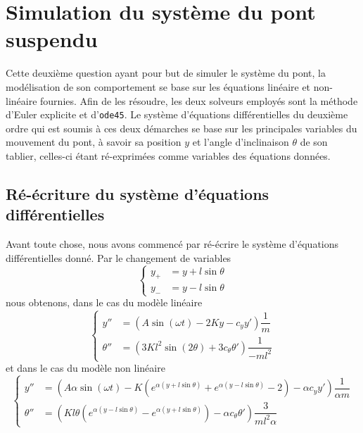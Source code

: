 \documentclass[a4paper, 12pt]{article}
\begin{document}
	\section{Simulation du système du pont suspendu}
	Cette deuxième question ayant pour but de simuler le système du pont, la modélisation de son comportement se base sur les équations linéaire et non-linéaire fournies. Afin de les résoudre, les deux solveurs employés sont la méthode d’Euler explicite et d'\texttt{ode45}. Le système d’équations différentielles du deuxième ordre qui est soumis à ces deux démarches se base sur les principales variables du mouvement du pont, à savoir sa position $y$ et l’angle d'inclinaison $\theta$ de son tablier, celles-ci étant ré-exprimées comme variables des équations données.
	\subsection{Ré-écriture du système d'équations différentielles}
	Avant toute chose, nous avons commencé par ré-écrire le système d'équations différentielles donné. Par le changement de variables
	\begin{equation*}
	\left\{\begin{aligned}
	y_{+} & = y + l \sin\theta \\ 
	y_{-} & = y - l \sin\theta
	\end{aligned}\right.
	\end{equation*}
	nous obtenons, dans le cas du modèle linéaire
	\begin{equation*}
	\left\{\begin{aligned}
	y'' & = \left(A \sin(\omega  t) - 2 K y - c_{y} y'\right) \dfrac{1}{m} \\
	\theta'' & = \left(3 K l^{2} \sin(2 \theta) + 3 c_{\theta} \theta'\right) \dfrac{1}{-m l^{2}}
	\end{aligned}\right.
	\end{equation*}
	et dans le cas du modèle non linéaire
	\begin{equation*}
	\left\{\begin{aligned}
	y'' & = \left(A\alpha \sin(\omega t) - K(e^{\alpha  (y + l \sin \theta)} + e^{\alpha  (y - l \sin \theta)} - 2) - \alpha c_{y} y'\right) \dfrac{1}{\alpha m} \\
	\theta'' & = \left(K  l \theta (e^{\alpha  (y - l \sin \theta)} - e^{\alpha  (y + l \sin \theta)}) - \alpha c_{\theta} \theta'\right) \dfrac{3}{m l^{2}\alpha}
	\end{aligned}\right.
	\end{equation*}
\end{document}
